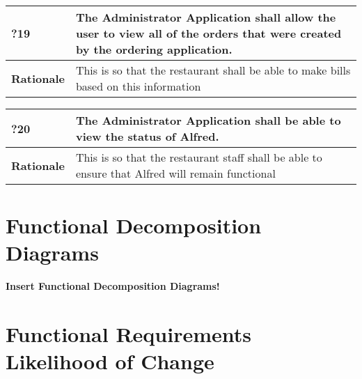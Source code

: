 \documentclass [11pt]{article}
\begin{document}
\begin{longtable}{| p{ } | p{ } | }\hline 
	\rowcolor{tableCell}\textbf{?19} & The Administrator Application shall allow the user to view all of the orders that were created by the ordering application. \\ \hline
	\textbf{Rationale} &  This is so that the restaurant shall be able to make bills based on this information\\ \hline 
\end{longtable}

\begin{longtable}{| p{ } | p{ } | }\hline 
	\rowcolor{tableCell}\textbf{?20} & The Administrator Application shall be able to view the status of Alfred. \\ \hline
	\textbf{Rationale} &  This is so that the restaurant staff shall be able to ensure that Alfred will remain functional\\ \hline 
\end{longtable}





\section{Functional Decomposition Diagrams}
\textbf{Insert Functional Decomposition Diagrams!}
%	
%
%
%	



\section{Functional Requirements Likelihood of Change} 
\end{document}
